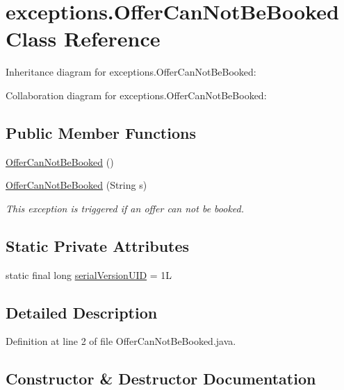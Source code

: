 \hypertarget{classexceptions_1_1OfferCanNotBeBooked}{}\section{exceptions.\+Offer\+Can\+Not\+Be\+Booked Class Reference}
\label{classexceptions_1_1OfferCanNotBeBooked}


Inheritance diagram for exceptions.\+Offer\+Can\+Not\+Be\+Booked\+:


Collaboration diagram for exceptions.\+Offer\+Can\+Not\+Be\+Booked\+:
\subsection*{Public Member Functions}
\begin{DoxyCompactItemize}
\item 
\mbox{\hyperlink{classexceptions_1_1OfferCanNotBeBooked_a113511bf6eedf993448d483ff55cabb0}{Offer\+Can\+Not\+Be\+Booked}} ()
\item 
\mbox{\hyperlink{classexceptions_1_1OfferCanNotBeBooked_a08f25182868a230f2b49b37483560486}{Offer\+Can\+Not\+Be\+Booked}} (String s)
\begin{DoxyCompactList}\small\item\em This exception is triggered if an offer can not be booked. \end{DoxyCompactList}\end{DoxyCompactItemize}
\subsection*{Static Private Attributes}
\begin{DoxyCompactItemize}
\item 
static final long \mbox{\hyperlink{classexceptions_1_1OfferCanNotBeBooked_a0f0deac6a5fe9077f31bd1c90f1b0b59}{serial\+Version\+U\+ID}} = 1L
\end{DoxyCompactItemize}


\subsection{Detailed Description}


Definition at line 2 of file Offer\+Can\+Not\+Be\+Booked.\+java.



\subsection{Constructor \& Destructor Documentation}
\mbox{\label{classexceptions_1_1OfferCanNotBeBooked_a113511bf6eedf993448d483ff55cabb0}} 
